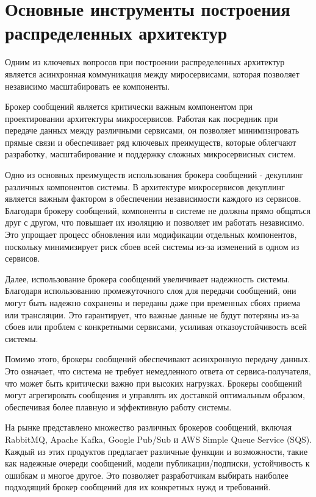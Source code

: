 \section{Основные инструменты построения распределенных архитектур}

Одним из ключевых вопросов при построении распределенных архитектур является асинхронная коммуникация
между миросервисами, которая позволяет независимо масштабировать ее компоненты.

Брокер сообщений является критически важным компонентом при проектировании архитектуры микросервисов. Работая как посредник при передаче данных между различными сервисами, он позволяет минимизировать прямые связи и обеспечивает ряд ключевых преимуществ, которые облегчают разработку, масштабирование и поддержку сложных микросервисных систем.

Одно из основных преимуществ использования брокера сообщений - декуплинг различных компонентов системы. В архитектуре микросервисов декуплинг является важным фактором в обеспечении независимости каждого из сервисов. Благодаря брокеру сообщений, компоненты в системе не должны прямо общаться друг с другом, что повышает их изоляцию и позволяет им работать независимо. Это упрощает процесс обновления или модификации отдельных компонентов, поскольку минимизирует риск сбоев всей системы из-за изменений в одном из сервисов.

Далее, использование брокера сообщений увеличивает надежность системы. Благодаря использованию промежуточного слоя для передачи сообщений, они могут быть надежно сохранены и переданы даже при временных сбоях приема или трансляции. Это гарантирует, что важные данные не будут потеряны из-за сбоев или проблем с конкретными сервисами, усиливая отказоустойчивость всей системы.

Помимо этого, брокеры сообщений обеспечивают асинхронную передачу данных. Это означает, что система не требует немедленного ответа от сервиса-получателя, что может быть критически важно при высоких нагрузках. Брокеры сообщений могут агрегировать сообщения и управлять их доставкой оптимальным образом, обеспечивая более плавную и эффективную работу системы.

На рынке представлено множество различных брокеров сообщений, включая RabbitMQ, Apache Kafka, Google Pub/Sub и AWS Simple Queue Service (SQS). Каждый из этих продуктов предлагает различные функции и возможности, такие как надежные очереди сообщений, модели публикации/подписки, устойчивость к ошибкам и многое другое. Это позволяет разработчикам выбирать наиболее подходящий брокер сообщений для их конкретных нужд и требований.

